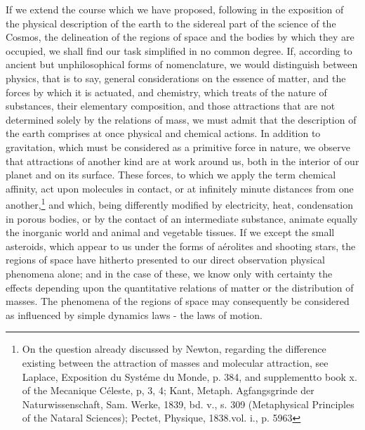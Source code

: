 If we extend the course which we have proposed, following in the exposition of the physical description of the earth to the sidereal part of the science of the Cosmos, the delineation of the regions of space and the bodies by which they are occupied, we shall find our task simplified in no common degree. If, according to ancient but unphilosophical forms of nomenclature, we would distinguish between physics, that is to say, general considerations on the essence of matter, and the forces by which it is actuated, and chemistry, which treats of the nature of substances, their elementary composition, and those attractions that are not determined solely by the relations of mass, we must admit that the description of the earth comprises at once physical and chemical actions. In addition to gravitation, which must be considered as a primitive force in nature, we observe that attractions of another kind are at work around us, both in the interior of our planet and on its surface. These forces, to which we apply the term chemical affinity, act upon molecules in contact, or at infinitely minute distances from one another,\footnote{On the question already discussed by Newton, regarding the difference existing between the attraction of masses and molecular attraction, see Laplace, Exposition du Syst\'{e}me du Monde, p. 384, and supplementto book x. of the Mecanique C\'{e}leste, p, 3, 4; Kant, Metaph. Agfangsgrinde der Naturwissenschaft, Sam. Werke, 1839, bd. v., s. 309 (Metaphysical Principles of the Nataral Sciences); Pectet, Physique, 1838.vol. i., p. 5963} and which, being differently modified by electricity, heat, condensation in porous bodies, or by the contact of an intermediate substance, animate equally the inorganic world and animal and vegetable tissues. If we except the small asteroids, which appear to us under the forms of a\'{e}rolites and shooting stars, the regions of space have hitherto presented to our direct observation physical phenomena alone; and in the case of these, we know only with certainty the effects depending upon the quantitative relations of matter or the distribution of masses. The phenomena of the regions of space may consequently be considered as influenced by simple dynamics laws - the laws of motion.

